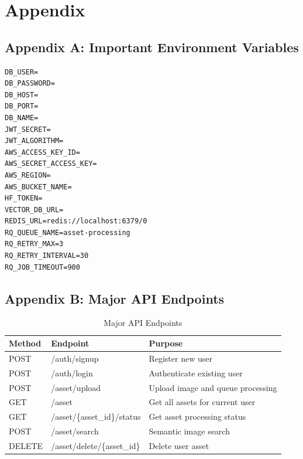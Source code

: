 \documentclass[12pt,a4paper]{report}
\begin{document}
\chapter*{Appendix}

\section*{Appendix A: Important Environment Variables}
\begin{lstlisting}[caption={Representative backend environment variables}]
DB_USER=
DB_PASSWORD=
DB_HOST=
DB_PORT=
DB_NAME=
JWT_SECRET=
JWT_ALGORITHM=
AWS_ACCESS_KEY_ID=
AWS_SECRET_ACCESS_KEY=
AWS_REGION=
AWS_BUCKET_NAME=
HF_TOKEN=
VECTOR_DB_URL=
REDIS_URL=redis://localhost:6379/0
RQ_QUEUE_NAME=asset-processing
RQ_RETRY_MAX=3
RQ_RETRY_INTERVAL=30
RQ_JOB_TIMEOUT=900
\end{lstlisting}

\section*{Appendix B: Major API Endpoints}
\begin{table}[H]
\centering
\caption{Major API Endpoints}
\begin{tabularx}{\textwidth}{|l|l|X|}
\hline
\textbf{Method} & \textbf{Endpoint} & \textbf{Purpose} \\
\hline
POST & /auth/signup & Register new user \\
\hline
POST & /auth/login & Authenticate existing user \\
\hline
POST & /asset/upload & Upload image and queue processing \\
\hline
GET & /asset & Get all assets for current user \\
\hline
GET & /asset/\{asset\_id\}/status & Get asset processing status \\
\hline
POST & /asset/search & Semantic image search \\
\hline
DELETE & /asset/delete/\{asset\_id\} & Delete user asset \\
\hline
\end{tabularx}
\end{table}
\end{document}
